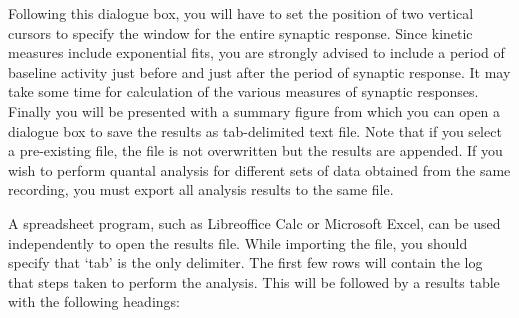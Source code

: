 \documentclass{article}
\begin{document}
Following this dialogue box, you will have to set the position of two vertical cursors to specify the window for the
entire synaptic response. Since kinetic measures include exponential fits, you are strongly advised to include a period
of baseline activity just before and just after the period of synaptic response. It may take some time for calculation
of the various measures of synaptic responses. Finally you will be presented with a summary figure from which you can
open a dialogue box to save the results as tab-delimited text file. Note that if you select a pre-existing file, the
file is not overwritten but the results are appended. If you wish to perform quantal analysis for different sets of data
obtained from the same recording, you must export all analysis results to the same file.

A spreadsheet program, such as Libreoffice Calc or Microsoft Excel, can be used independently to open the results file.
While importing the file, you should specify that `tab' is the only delimiter. The first few rows will contain the log
that steps taken to perform the analysis. This will be followed by a results table with the following headings:
\end{document}
